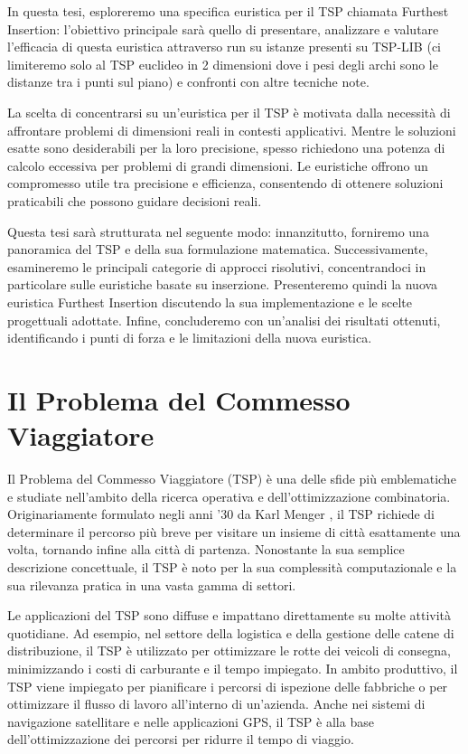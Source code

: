 \documentclass[a4paper,12pt]{report}
\begin{document}
In questa tesi, esploreremo una specifica euristica per il TSP chiamata Furthest Insertion: l'obiettivo principale sarà quello di presentare, analizzare e valutare l'efficacia di questa euristica attraverso run su istanze presenti su TSP-LIB (ci limiteremo solo al TSP euclideo in 2 dimensioni dove i pesi degli archi sono le distanze tra i punti sul piano) e confronti con altre tecniche note.

La scelta di concentrarsi su un'euristica per il TSP è motivata dalla necessità di affrontare problemi di dimensioni reali in contesti applicativi. Mentre le soluzioni esatte sono desiderabili per la loro precisione, spesso richiedono una potenza di calcolo eccessiva per problemi di grandi dimensioni. Le euristiche offrono un compromesso utile tra precisione e efficienza, consentendo di ottenere soluzioni praticabili che possono guidare decisioni reali.

Questa tesi sarà strutturata nel seguente modo: innanzitutto, forniremo una panoramica del TSP e della sua formulazione matematica. Successivamente, esamineremo le principali categorie di approcci risolutivi, concentrandoci in particolare sulle euristiche basate su inserzione. Presenteremo quindi la nuova euristica Furthest Insertion discutendo la sua implementazione e le scelte progettuali adottate. Infine, concluderemo con un'analisi dei risultati ottenuti, identificando i punti di forza e le limitazioni della nuova euristica.

\afterpreface
% 
% 
\chapter{Il Problema del Commesso Viaggiatore}
Il Problema del Commesso Viaggiatore (TSP) è una delle sfide più emblematiche e studiate nell'ambito della ricerca operativa e dell'ottimizzazione combinatoria. Originariamente formulato negli anni '30 da Karl Menger \cite{Menger}, il TSP richiede di determinare il percorso più breve per visitare un insieme di città esattamente una volta, tornando infine alla città di partenza. Nonostante la sua semplice descrizione concettuale, il TSP è noto per la sua complessità computazionale e la sua rilevanza pratica in una vasta gamma di settori.

Le applicazioni del TSP sono diffuse e impattano direttamente su molte attività quotidiane. Ad esempio, nel settore della logistica e della gestione delle catene di distribuzione, il TSP è utilizzato per ottimizzare le rotte dei veicoli di consegna, minimizzando i costi di carburante e il tempo impiegato. In ambito produttivo, il TSP viene impiegato per pianificare i percorsi di ispezione delle fabbriche o per ottimizzare il flusso di lavoro all'interno di un'azienda. Anche nei sistemi di navigazione satellitare e nelle applicazioni GPS, il TSP è alla base dell'ottimizzazione dei percorsi per ridurre il tempo di viaggio.
\end{document}
